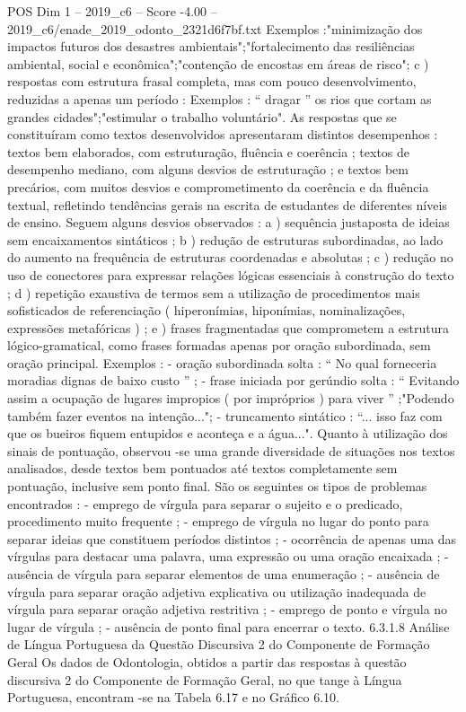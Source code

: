 \begin{textsample}{POS Dim 1 – 2019\_c6 – Score -4.00 – 2019\_c6/enade\_2019\_odonto\_2321d6f7bf.txt}
Exemplos :"minimização dos impactos futuros dos desastres ambientais";"fortalecimento das resiliências ambiental, social e econômica";"contenção de encostas em áreas de risco"; c ) respostas com estrutura frasal completa, mas com pouco desenvolvimento, reduzidas a apenas um período : Exemplos : “ dragar ” os rios que cortam as grandes cidades";"estimular o trabalho voluntário".
As respostas que se constituíram como textos desenvolvidos apresentaram distintos desempenhos : textos bem elaborados, com estruturação, fluência e coerência ; textos de desempenho mediano, com alguns desvios de estruturação ; e textos bem precários, com muitos desvios e comprometimento da coerência e da fluência textual, refletindo tendências gerais na escrita de estudantes de diferentes níveis de ensino.
Seguem alguns desvios observados : a ) sequência justaposta de ideias sem encaixamentos sintáticos ; b ) redução de estruturas subordinadas, ao lado do aumento na frequência de estruturas coordenadas e absolutas ; c ) redução no uso de conectores para expressar relações lógicas essenciais à construção do texto ; d ) repetição exaustiva de termos sem a utilização de procedimentos mais sofisticados de referenciação ( hiperonímias, hiponímias, nominalizações, expressões metafóricas ) ; e ) frases fragmentadas que comprometem a estrutura lógico-gramatical, como frases formadas apenas por oração subordinada, sem oração principal.
Exemplos : - oração subordinada solta : “ No qual forneceria moradias dignas de baixo custo ” ; - frase iniciada por gerúndio solta : “ Evitando assim a ocupação de lugares impropios ( por impróprios ) para viver ” ;"Podendo também fazer eventos na intenção..."; - truncamento sintático : “... isso faz com que os bueiros fiquem entupidos e aconteça e a água...".
Quanto à utilização dos sinais de pontuação, observou -se uma grande diversidade de situações nos textos analisados, desde textos bem pontuados até textos completamente sem pontuação, inclusive sem ponto final.
São os seguintes os tipos de problemas encontrados : - emprego de vírgula para separar o sujeito e o predicado, procedimento muito frequente ; - emprego de vírgula no lugar do ponto para separar ideias que constituem períodos distintos ; - ocorrência de apenas uma das vírgulas para destacar uma palavra, uma expressão ou uma oração encaixada ; - ausência de vírgula para separar elementos de uma enumeração ; - ausência de vírgula para separar oração adjetiva explicativa ou utilização inadequada de vírgula para separar oração adjetiva restritiva ; - emprego de ponto e vírgula no lugar de vírgula ; - ausência de ponto final para encerrar o texto. 6.3.1.8 Análise de Língua Portuguesa da Questão Discursiva 2 do Componente de Formação Geral Os dados de Odontologia, obtidos a partir das respostas à questão discursiva 2 do Componente de Formação Geral, no que tange à Língua Portuguesa, encontram -se na Tabela 6.17 e no Gráfico 6.10.

\end{textsample}
